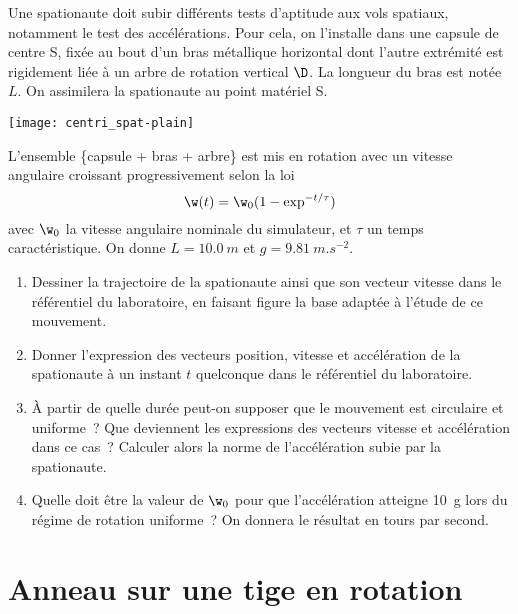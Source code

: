 \documentclass[a4paper, 12pt, final, garamond]{book}
\begin{document}
\hspace*{-0.75cm}
\begin{minipage}{0.70\linewidth}
    Une spationaute doit subir différents tests d'aptitude aux vols spatiaux,
    notamment le test des accélérations. Pour cela, on l'installe dans une
    capsule de centre S, fixée au bout d'un bras métallique horizontal dont
    l'autre extrémité est rigidement liée à un arbre de rotation vertical $\D$.
    La longueur du bras est notée $L$. On assimilera la spationaute au point
    matériel S. \bigbreak
\end{minipage}
\hfill
\begin{minipage}{0.25\linewidth}
    \begin{center}
        \texttt{[image: centri\_spat-plain]}
    \end{center}
\end{minipage}

L'ensemble \{capsule + bras + arbre\} est mis en rotation avec un vitesse
angulaire croissant progressivement selon la loi
\[\w(t) = \w_0(1-\exp^{-t/\tau})\]
avec $\w_0$ la vitesse angulaire nominale du simulateur, et $\tau$ un temps
caractéristique. On donne $L = \SI{10.0}{m}$ et $g = \SI{9.81}{m.s^{-2}}$.
\bigbreak
\begin{enumerate}
    \item Dessiner la trajectoire de la spationaute ainsi que son vecteur
        vitesse dans le référentiel du laboratoire, en faisant figure la base
        adaptée à l'étude de ce mouvement.
    \item Donner l'expression des vecteurs position, vitesse et accélération de
        la spationaute à un instant $t$ quelconque dans le référentiel du
        laboratoire.
    \item À partir de quelle durée peut-on supposer que le mouvement est
        circulaire et uniforme~? Que deviennent les expressions des vecteurs
        vitesse et accélération dans ce cas~? Calculer alors la norme de
        l'accélération subie par la spationaute.
    \item Quelle doit être la valeur de $\w_0$ pour que l'accélération atteigne
        \SI{10}{g} lors du régime de rotation uniforme~? On donnera le résultat
        en tours par second.
\end{enumerate}

\section{Anneau sur une tige en rotation}
\end{document}
